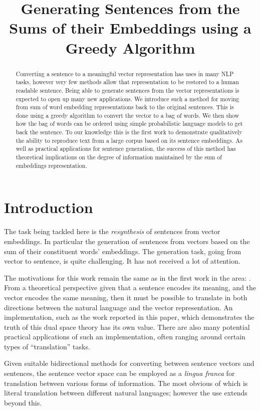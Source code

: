 \documentclass[11pt]{article}
\title{Generating Sentences from the Sums of their Embeddings using a Greedy Algorithm}
\author{}
\theoremstyle{plain}
\theoremstyle{definition}
\begin{document}
\maketitle

\begin{abstract}
Converting a sentence to a meaningful vector representation has uses in many NLP tasks, however very few methods allow that representation to be restored to a human readable sentence. Being able to generate sentences from the vector representations is expected to open up many new applications. We introduce such a method for moving from sum of word embedding representations back to the original sentences. This is done using a greedy algorithm to convert the vector to a bag of words. We then show how the bag of words can be ordered using simple probabilistic language models to get back the sentence. To our knowledge this is the first work to demonstrate qualitatively the ability to reproduce text from a large corpus based on its sentence embeddings. 
As well as practical applications for sentence generation, the success of this method has theoretical implications on the degree of information maintained by the sum of embeddings representation.
\end{abstract}

\section{Introduction} \label{intro}


The task being tackled here is the \emph{resynthesis} of sentences from vector embeddings. In particular the generation of sentences from vectors based on the sum of their constituent words' embeddings. The generation task, going from vector to sentence, is quite challenging. It has not received a lot of attention.

The motivations for this work remain the same as in the first work in the area: \textcite{Dinu2014CompositionalGeneration}. From a theoretical perspective given that a sentence encodes its meaning, and the vector encodes the same meaning, then it must be possible to translate in both directions between the natural language and the vector representation. An implementation, such as the work reported in this paper, which demonstrates the truth of this dual space theory has its own value. There are also many potential practical applications of such an implementation, often ranging around certain types of ``translation'' tasks.

Given suitable bidirectional methods for converting between sentence vectors and sentences, the sentence vector space can be employed as a \emph{lingua franca} for translation between various forms of information. The most obvious of which is literal translation between different natural languages; however the use extends beyond this.
\end{document}
